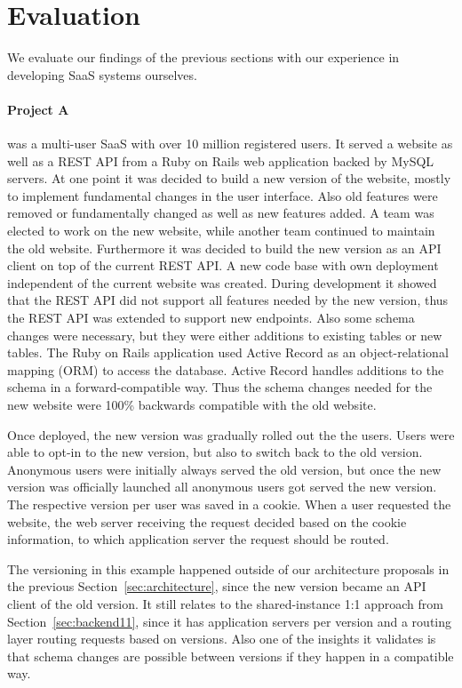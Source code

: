 
\section{Evaluation}
\label{sec:eval}

We evaluate our findings of the previous sections with our experience in developing SaaS systems ourselves.

\paragraph{Project A} was a multi-user SaaS with over 10 million registered users. It served a website as well as a REST API from a Ruby on Rails web application backed by MySQL servers. At one point it was decided to build a new version of the website, mostly to implement fundamental changes in the user interface. Also old features were removed or fundamentally changed as well as new features added. A team was elected to work on the new website, while another team continued to maintain the old website. Furthermore it was decided to build the new version as an API client on top of the current REST API. A new code base with own deployment independent of the current website was created. During development it showed that the REST API did not support all features needed by the new version, thus the REST API was extended to support new endpoints. Also some schema changes were necessary, but they were either additions to existing tables or new tables. The Ruby on Rails application used Active Record as an object-relational mapping (ORM) to access the database. Active Record handles additions to the schema in a forward-compatible way. Thus the schema changes needed for the new website were 100\% backwards compatible with the old website.

Once deployed, the new version was gradually rolled out the the users. Users were able to opt-in to the new version, but also to switch back to the old version. Anonymous users were initially always served the old version, but once the new version was officially launched all anonymous users got served the new version. The respective version per user was saved in a cookie. When a user requested the website, the web server receiving the request decided based on the cookie information, to which application server the request should be routed.

The versioning in this example happened outside of our architecture proposals in the previous Section~\ref{sec:architecture}, since the new version became an API client of the old version. It still relates to the shared-instance 1:1 approach from Section~\ref{sec:backend11}, since it has application servers per version and a routing layer routing requests based on versions. Also one of the insights it validates is that schema changes are possible between versions if they happen in a compatible way.

